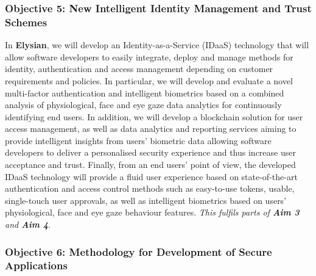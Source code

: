 \documentclass[a4paper,11pt]{article}
\newcommand{\project}[1]{\textbf{#1}\xspace}
\newcommand{\SECURITY}{\project{Elysian}}
\newcommand{\TheProject}{\SECURITY}
\begin{document}
\subsubsection*{Objective 5: New Intelligent Identity Management and Trust Schemes}
\vspace{-6pt}

In \TheProject{}, we will develop an Identity-as-a-Service (IDaaS) technology that will allow software developers to easily integrate, deploy and manage methods for identity, authentication and access management depending on customer requirements and policies. In particular, we will develop and evaluate a novel multi-factor authentication and intelligent biometrics based on a combined analysis of physiological, face and eye gaze data analytics for continuously identifying end users. In addition, we will develop a blockchain solution for user access management, as well as data analytics and reporting services aiming to provide intelligent insights from users' biometric data allowing software developers to deliver a personalised security experience and thus increase user acceptance and trust. Finally, from an end users' point of view, the developed IDaaS technology will provide a fluid user experience based on state-of-the-art authentication and access control methods such as easy-to-use tokens, usable, single-touch user approvals, as well as intelligent biometrics based on users' physiological, face and eye gaze behaviour features. \emph{This fulfils parts of \textbf{Aim 3} and \textbf{Aim 4}}.

\subsubsection*{Objective 6: Methodology for Development of Secure Applications}
\vspace{-6pt}
\end{document}
